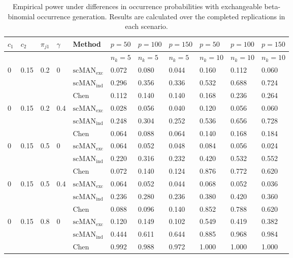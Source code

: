 \begin{table}[H]
\scriptsize
\centering
\caption{Empirical power under differences in occurrence probabilities with exchangeable beta-binomial occurrence generation. Results are calculated over the completed replications in each scenario.}
\label{tab:occurrence-power-exchangeable}
\begin{tabular}{lllllllllll}
\hline
$c_1$ & $c_2$ & $\pi_{j1}$ & $\gamma$ & Method & $p=50$ & $p=100$ & $p=150$ & $p=50$ & $p=100$ & $p=150$ \\
\hline
& & & & & $n_k=5$ & $n_k=5$ & $n_k=5$ & $n_k=10$ & $n_k=10$ & $n_k=10$ \\
0 & 0.15 & 0.2 & 0 & $\mathrm{scMAN}_{\mathrm{exc}}$ & 0.072 & 0.080 & 0.044 & 0.160 & 0.112 & 0.060 \\
 &  &  &  & $\mathrm{scMAN}_{\mathrm{ind}}$ & 0.296 & 0.356 & 0.336 & 0.532 & 0.688 & 0.724 \\
 &  &  &  & Chen & 0.112 & 0.140 & 0.140 & 0.168 & 0.236 & 0.264 \\
0 & 0.15 & 0.2 & 0.4 & $\mathrm{scMAN}_{\mathrm{exc}}$ & 0.028 & 0.056 & 0.040 & 0.120 & 0.056 & 0.060 \\
 &  &  &  & $\mathrm{scMAN}_{\mathrm{ind}}$ & 0.248 & 0.304 & 0.252 & 0.536 & 0.656 & 0.728 \\
 &  &  &  & Chen & 0.064 & 0.088 & 0.064 & 0.140 & 0.168 & 0.184 \\
0 & 0.15 & 0.5 & 0 & $\mathrm{scMAN}_{\mathrm{exc}}$ & 0.064 & 0.052 & 0.048 & 0.084 & 0.056 & 0.024 \\
 &  &  &  & $\mathrm{scMAN}_{\mathrm{ind}}$ & 0.220 & 0.316 & 0.232 & 0.420 & 0.532 & 0.552 \\
 &  &  &  & Chen & 0.072 & 0.140 & 0.124 & 0.876 & 0.772 & 0.620 \\
0 & 0.15 & 0.5 & 0.4 & $\mathrm{scMAN}_{\mathrm{exc}}$ & 0.064 & 0.052 & 0.044 & 0.068 & 0.052 & 0.036 \\
 &  &  &  & $\mathrm{scMAN}_{\mathrm{ind}}$ & 0.236 & 0.280 & 0.236 & 0.380 & 0.420 & 0.360 \\
 &  &  &  & Chen & 0.088 & 0.096 & 0.140 & 0.852 & 0.788 & 0.620 \\
0 & 0.15 & 0.8 & 0 & $\mathrm{scMAN}_{\mathrm{exc}}$ & 0.120 & 0.149 & 0.102 & 0.549 & 0.419 & 0.382 \\
 &  &  &  & $\mathrm{scMAN}_{\mathrm{ind}}$ & 0.444 & 0.611 & 0.644 & 0.885 & 0.968 & 0.984 \\
 &  &  &  & Chen & 0.992 & 0.988 & 0.972 & 1.000 & 1.000 & 1.000 \\

\end{tabular}
\end{table}
